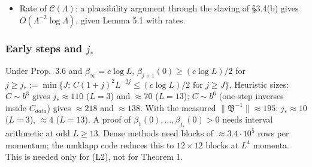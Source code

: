 \begin{itemize}
\item Rate of $\mathcal C(\Lambda)$: a plausibility argument through the slaving of  \S3.4(b) gives $O(\Lambda^{-2}\log\Lambda)$, given Lemma 5.1 with rates.
\end{itemize}

\subsubsection{Early steps and $j_*$}\label{sec:jstar}
Under Prop.\ 3.6 and $\beta_\infty=c\log L$, $\beta_{j+1}(0)\ge(c\log L)/2$ for $j\ge j_*:=\min\{J:\,C(1+j)^2L^{-2j}\le(c\log L)/2\text{ for }j\ge J\}$. Heuristic sizes: $C\sim b^3$ gives $j_*\approx110$ ($L=3$) and $\approx70$ ($L=13$); $C\sim b^6$ (one-step inverses inside $C_{data}$) gives $\approx218$ and $\approx138$. With the measured $\|\mathfrak B^{-1}\|\approx195$: $j_*\approx10$ ($L=3$), $\approx4$ ($L=13$). A proof of $\beta_1(0),\dots,\beta_{j_*}(0)>0$ needs interval arithmetic at odd $L\ge13$. Dense methods need blocks of $\approx3.4\cdot10^5$ rows per momentum; the umklapp code reduces this to $12\times12$ blocks at $L^4$ momenta. This is needed only for (L2), not for Theorem 1.
